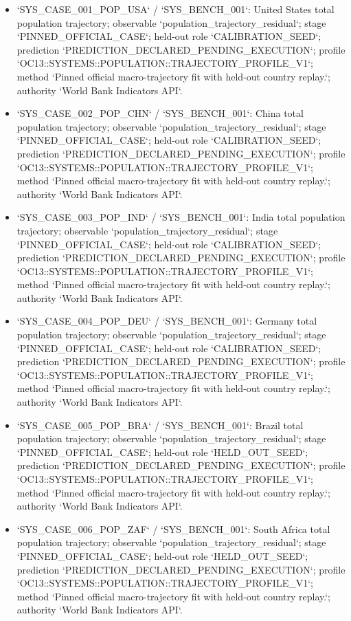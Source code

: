 \begin{itemize}
\item `SYS\_CASE\_001\_POP\_USA` / `SYS\_BENCH\_001`: United States total population trajectory; observable `population\_trajectory\_residual`; stage `PINNED\_OFFICIAL\_CASE`; held-out role `CALIBRATION\_SEED`; prediction `PREDICTION\_DECLARED\_PENDING\_EXECUTION`; profile `OC13::SYSTEMS::POPULATION::TRAJECTORY\_PROFILE\_V1`; method `Pinned official macro-trajectory fit with held-out country replay.`; authority `World Bank Indicators API`.
\item `SYS\_CASE\_002\_POP\_CHN` / `SYS\_BENCH\_001`: China total population trajectory; observable `population\_trajectory\_residual`; stage `PINNED\_OFFICIAL\_CASE`; held-out role `CALIBRATION\_SEED`; prediction `PREDICTION\_DECLARED\_PENDING\_EXECUTION`; profile `OC13::SYSTEMS::POPULATION::TRAJECTORY\_PROFILE\_V1`; method `Pinned official macro-trajectory fit with held-out country replay.`; authority `World Bank Indicators API`.
\item `SYS\_CASE\_003\_POP\_IND` / `SYS\_BENCH\_001`: India total population trajectory; observable `population\_trajectory\_residual`; stage `PINNED\_OFFICIAL\_CASE`; held-out role `CALIBRATION\_SEED`; prediction `PREDICTION\_DECLARED\_PENDING\_EXECUTION`; profile `OC13::SYSTEMS::POPULATION::TRAJECTORY\_PROFILE\_V1`; method `Pinned official macro-trajectory fit with held-out country replay.`; authority `World Bank Indicators API`.
\item `SYS\_CASE\_004\_POP\_DEU` / `SYS\_BENCH\_001`: Germany total population trajectory; observable `population\_trajectory\_residual`; stage `PINNED\_OFFICIAL\_CASE`; held-out role `CALIBRATION\_SEED`; prediction `PREDICTION\_DECLARED\_PENDING\_EXECUTION`; profile `OC13::SYSTEMS::POPULATION::TRAJECTORY\_PROFILE\_V1`; method `Pinned official macro-trajectory fit with held-out country replay.`; authority `World Bank Indicators API`.
\item `SYS\_CASE\_005\_POP\_BRA` / `SYS\_BENCH\_001`: Brazil total population trajectory; observable `population\_trajectory\_residual`; stage `PINNED\_OFFICIAL\_CASE`; held-out role `HELD\_OUT\_SEED`; prediction `PREDICTION\_DECLARED\_PENDING\_EXECUTION`; profile `OC13::SYSTEMS::POPULATION::TRAJECTORY\_PROFILE\_V1`; method `Pinned official macro-trajectory fit with held-out country replay.`; authority `World Bank Indicators API`.
\item `SYS\_CASE\_006\_POP\_ZAF` / `SYS\_BENCH\_001`: South Africa total population trajectory; observable `population\_trajectory\_residual`; stage `PINNED\_OFFICIAL\_CASE`; held-out role `HELD\_OUT\_SEED`; prediction `PREDICTION\_DECLARED\_PENDING\_EXECUTION`; profile `OC13::SYSTEMS::POPULATION::TRAJECTORY\_PROFILE\_V1`; method `Pinned official macro-trajectory fit with held-out country replay.`; authority `World Bank Indicators API`.

\end{itemize}
